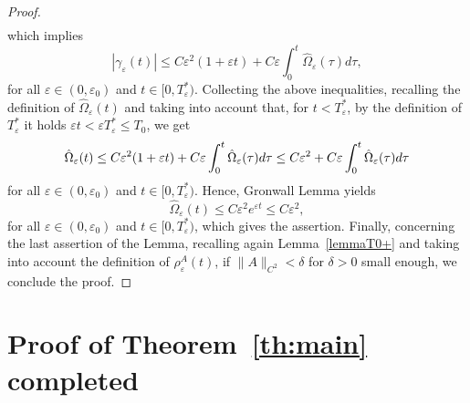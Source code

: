 \documentclass[11pt]{amsart}
\numberwithin{equation}{section}
\theoremstyle{definition}
\begin{document}
\begin{proof}
\begin{align}
\end{align}
which implies
\begin{equation}
\label{p3} |\gamma_{\varepsilon}(t)|\leq
C{\varepsilon}^2(1+{\varepsilon} t)+C{\varepsilon}\int_0^t \hat\Omega_{\varepsilon}(\tau)d\tau,
\end{equation}
for all ${\varepsilon}\in (0,{\varepsilon}_0)$ and $t\in [0,T^*_{\varepsilon})$. Collecting the above
inequalities, recalling the definition of
$\hat\Omega_{\varepsilon}(t)$ and taking into account that, for $t<T^*_{\varepsilon}$,
by the definition of $T_{\varepsilon}^*$ it holds ${\varepsilon} t< {\varepsilon} T_{\varepsilon}^*\leq T_0$, we get
\begin{equation*}
\hat\Omega_{\varepsilon}(t) \leq C{\varepsilon}^2(1+{\varepsilon} t)+C{\varepsilon}\int_{0}^t \hat\Omega_{\varepsilon}(\tau) d\tau \\
 \leq C{\varepsilon}^2+C{\varepsilon}\int_{0}^t \hat\Omega_{\varepsilon}(\tau) d\tau
\end{equation*}
for all ${\varepsilon}\in (0,{\varepsilon}_0)$ and $t\in [0,T^*_{\varepsilon})$. Hence, Gronwall Lemma
yields
$$
\hat\Omega_{\varepsilon}(t)\leq C{\varepsilon}^2 e^{{\varepsilon} t}\leq C{\varepsilon}^2,
$$
for all ${\varepsilon}\in (0,{\varepsilon}_0)$ and $t\in [0,T^*_{\varepsilon})$, which gives the assertion.
Finally, concerning the last assertion of the Lemma,
recalling again Lemma~\ref{lemmaT0+} and taking into account the definition of $\rho_{\varepsilon}^A(t)$,
if $\|A\|_{C^2}<\delta$ for $\delta>0$ small enough, we conclude the proof.
\end{proof}

\medskip

\section{Proof of Theorem~\ref{th:main} completed}
\label{proof-section}
\end{document}
